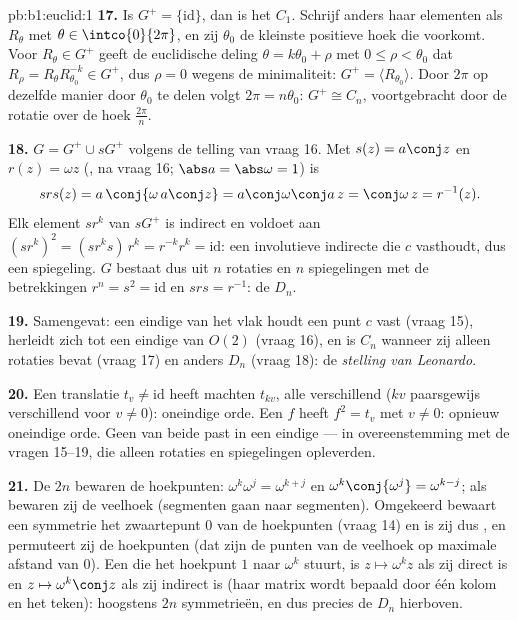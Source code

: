 \begin{solution}{pb:b1:euclid:1}
\textbf{17.} Is $G^{+} = \{\mathrm{id}\}$, dan is het $C_1$.
Schrijf anders haar elementen als $R_\theta$ met $\theta \in
\intco{0}{2\pi}$, en zij $\theta_0$ de kleinste positieve hoek die
voorkomt. Voor $R_\theta \in G^{+}$ geeft de euclidische deling
$\theta = k\theta_0 + \rho$ met $0 \leq \rho < \theta_0$ dat
$R_\rho = R_\theta R_{\theta_0}^{-k} \in G^{+}$, dus $\rho = 0$
wegens de minimaliteit: $G^{+} = \langle R_{\theta_0}\rangle$. Door
$2\pi$ op dezelfde manier door $\theta_0$ te delen volgt $2\pi =
n\theta_0$: $G^{+} \cong C_n$, voortgebracht door de rotatie over
de hoek $\frac{2\pi}n$.

\textbf{18.} $G = G^{+} \cup sG^{+}$ volgens de telling van vraag
16. Met $s(z) = a\conj z$ en $r(z) = \omega z$ (, na
vraag 16; $\abs a = \abs\omega = 1$) is
\[
s r s(z) = a\,\conj{\omega\,a\conj z}
= a\conj\omega\conj a\,z = \conj\omega\,z = r^{-1}(z) .
\]
Elk element $sr^k$ van $sG^{+}$ is indirect en voldoet aan
$(sr^k)^2 = (sr^ks)\,r^k = r^{-k}r^k = \mathrm{id}$: een
involutieve indirecte  die $c$ vasthoudt, dus een
spiegeling. $G$ bestaat dus uit $n$ rotaties en $n$ spiegelingen
met de betrekkingen $r^n = s^2 = \mathrm{id}$ en $srs = r^{-1}$: de
 $D_n$.

\textbf{19.} Samengevat: een eindige   van het vlak
houdt een punt $c$ vast (vraag 15), herleidt zich tot een eindige
 van $O(2)$ (vraag 16), en is $C_n$ wanneer zij alleen
rotaties bevat (vraag 17) en anders $D_n$ (vraag 18): de
\emph{stelling van Leonardo}.

\textbf{20.} Een translatie $t_v \neq \mathrm{id}$ heeft machten
$t_{kv}$, alle verschillend ($kv$ paarsgewijs verschillend voor $v
\neq 0$): oneindige orde. Een  $f$ heeft $f^2 = t_v$
met $v \neq 0$: opnieuw oneindige orde. Geen van beide past in een
eindige  --- in overeenstemming met de vragen 15--19, die
alleen rotaties en spiegelingen opleverden.

\textbf{21.} De $2n$  bewaren de 
hoekpunten: $\omega^k \omega^j = \omega^{k+j}$ en
$\omega^k\conj{\omega^j} = \omega^{k-j}$; als  bewaren
zij de veelhoek (segmenten gaan naar segmenten). Omgekeerd bewaart
een symmetrie het zwaartepunt $0$ van de hoekpunten (vraag 14) en
is zij dus , en permuteert zij de hoekpunten (dat zijn de
punten van de veelhoek op maximale afstand van $0$). Een 
 die het hoekpunt $1$ naar $\omega^k$ stuurt, is $z
\mapsto \omega^k z$ als zij direct is en $z \mapsto \omega^k\conj
z$ als zij indirect is (haar matrix wordt bepaald door één kolom en
het teken): hoogstens $2n$ symmetrieën, en dus precies de $D_n$
hierboven.


\end{solution}
